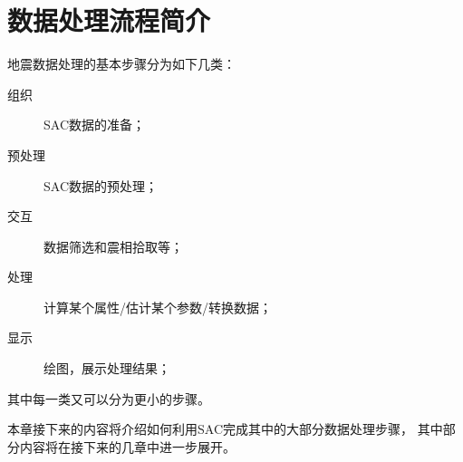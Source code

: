 \section{数据处理流程简介}

地震数据处理的基本步骤分为如下几类：
\begin{description}
\item[组织] SAC数据的准备；
\item[预处理] SAC数据的预处理；
\item[交互] 数据筛选和震相拾取等；
\item[处理] 计算某个属性/估计某个参数/转换数据；
\item[显示] 绘图，展示处理结果；
\end{description}
其中每一类又可以分为更小的步骤。

本章接下来的内容将介绍如何利用SAC完成其中的大部分数据处理步骤，
其中部分内容将在接下来的几章中进一步展开。
